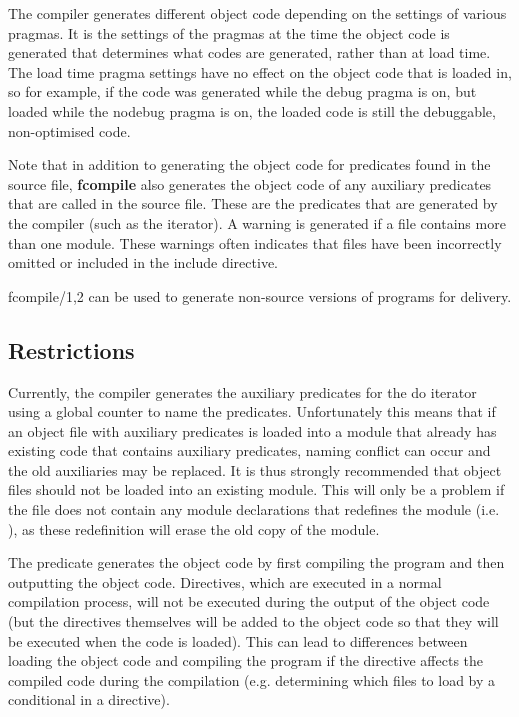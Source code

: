 The compiler generates different object code depending on the settings of
various pragmas. It is the settings of the pragmas at the time the object
code is generated that determines what codes are generated, rather than at
load time. The load time pragma settings have no effect on the object code
that is loaded in, so for example, if the code was generated while the
debug pragma is on, but loaded while the nodebug pragma is on, the loaded
code is still the debuggable, non-optimised code.
 
Note that in addition to generating the object code for predicates found in
the source file, {\bf fcompile} also generates the object code of any 
auxiliary predicates that are called in the source file.
These are the
predicates that are generated by the compiler (such as the 
iterator). A warning is 
generated if a file contains more than one module. These warnings often
indicates that files have been incorrectly omitted or included in the
include directive. 



fcompile/1,2 can be used to
generate non-source versions of programs for delivery. 

\subsection{Restrictions}

Currently, the compiler generates the auxiliary predicates for the do
iterator using a global counter to name the predicates. Unfortunately this
means that if an object file with auxiliary predicates is loaded into a
module that already has existing code that contains auxiliary predicates, 
naming conflict can occur and the old auxiliaries may be replaced. It is
thus strongly recommended that object files should not be loaded into an
existing module. This will only be a problem if the file does not contain
any module declarations that redefines the module (i.e. ),
as these redefinition will erase the old copy of
the module.

The predicate generates the object code by first compiling the program and
then outputting the object code. Directives, which are executed in a normal
compilation process, will not be executed during the output of the object
code (but the directives themselves will be added to the object code so
that they will be executed when the code is loaded). This can lead to
differences between loading the object code and compiling the program if
the directive affects the compiled code during the compilation
(e.g. determining which files to load by a conditional in a
directive). 

